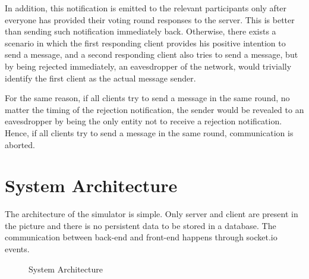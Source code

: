 In addition, this notification is emitted to the relevant participants only after everyone has provided their voting round responses to the server. This is better than sending such notification immediately back. Otherwise, there exists a scenario in which the first responding client provides his positive intention to send a message, and a second responding client also tries to send a message, but by being rejected immediately, an eavesdropper of the network, would trivially identify the first client as the actual message sender.

For the same reason, if all clients try to send a message in the same round, no matter the timing of the rejection notification,  the sender would be revealed to an eavesdropper by being the only entity not to receive a rejection notification. Hence, if all clients try to send a message in the same round, communication is aborted.


\section{System Architecture}
The architecture of the simulator is simple. Only server and client are present in the picture and there is no persistent data to be stored in a database. The communication between back-end and front-end happens through socket.io events.

\begin{figure}[H]
    \centering
    \caption{System Architecture}
    \label{fig:systemArchitecture}
\end{figure}



